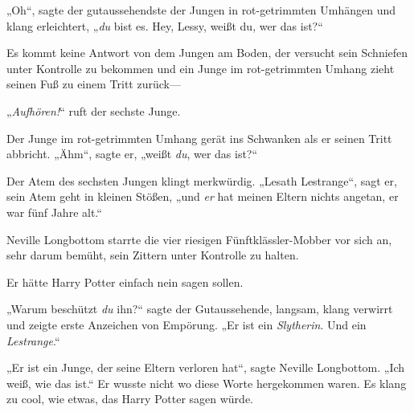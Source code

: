 „Oh“, sagte der gutaussehendste der Jungen in rot-getrimmten Umhängen und klang erleichtert, „\emph{du} bist es. Hey, Lessy, weißt du, wer das ist?“

Es kommt keine Antwort von dem Jungen am Boden, der versucht sein Schniefen unter Kontrolle zu bekommen und ein Junge im rot-getrimmten Umhang zieht seinen Fuß zu einem Tritt zurück—

„\emph{Aufhören!}“ ruft der sechste Junge.

Der Junge im rot-getrimmten Umhang gerät ins Schwanken als er seinen Tritt abbricht. „Ähm“, sagte er, „weißt \emph{du}, wer das ist?“

Der Atem des sechsten Jungen klingt merkwürdig. „Lesath Lestrange“, sagt er, sein Atem geht in kleinen Stößen, „und \emph{er} hat meinen Eltern nichts angetan, er war fünf Jahre alt.“

\later

Neville Longbottom starrte die vier riesigen Fünftklässler-Mobber vor sich an, sehr darum bemüht, sein Zittern unter Kontrolle zu halten.

Er hätte Harry Potter einfach nein sagen sollen.

„Warum beschützt \emph{du} ihn?“ sagte der Gutaussehende, langsam, klang verwirrt und zeigte erste Anzeichen von Empörung. „Er ist ein \emph{Slytherin}. Und ein \emph{Lestrange}.“

„Er ist ein Junge, der seine Eltern verloren hat“, sagte Neville Longbottom. „Ich weiß, wie das ist.“ Er wusste nicht wo diese Worte hergekommen waren. Es klang zu cool, wie etwas, das Harry Potter sagen würde.

